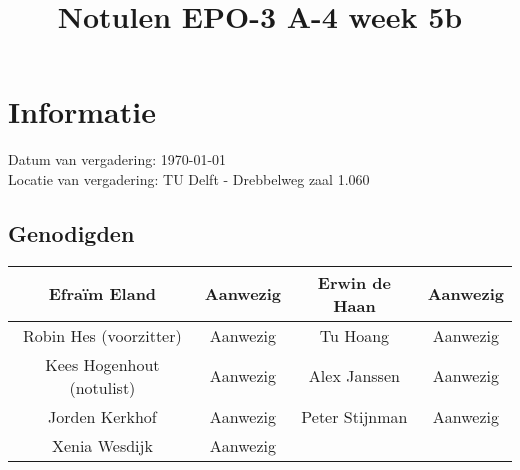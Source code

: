 \documentclass{article}
\begin{document}
\title{Notulen EPO-3 A-4 week 5b }%
\author{}%
\maketitle

\section*{Informatie}
Datum van vergadering: \today \\ %
Locatie van vergadering: TU Delft - Drebbelweg zaal 1.060 %
\subsection*{Genodigden}
\begin{center}
\begin{tabular}{|c |c | c| c|}
	\hline
Efraïm Eland & Aanwezig & Erwin de Haan & Aanwezig \\
	\hline
Robin Hes (voorzitter) & Aanwezig & Tu Hoang & Aanwezig \\
	\hline
Kees Hogenhout (notulist) & Aanwezig & Alex Janssen & Aanwezig\\
	\hline
Jorden Kerkhof & Aanwezig & Peter Stijnman & Aanwezig \\
	\hline
Xenia Wesdijk & Aanwezig & & \\
	\hline
\end{tabular}
\end{center}
\end{document}
